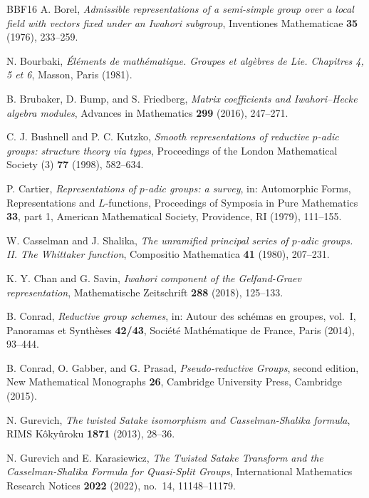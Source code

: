 \documentclass[12pt]{article}
\numberwithin{equation}{section}
\theoremstyle{definition}
\theoremstyle{remark}
\theoremstyle{plain}
\begin{document}
\begin{thebibliography}{BBF16}
\setlength{\itemsep}{1pt}
 A. Borel, \textit{Admissible representations of a semi-simple group over a local field with vectors fixed under an Iwahori subgroup}, Inventiones Mathematicae \textbf{35} (1976), 233--259.

 N. Bourbaki, \textit{\'El\'ements de math\'ematique. Groupes et alg\`ebres de Lie. Chapitres 4, 5 et 6}, Masson, Paris (1981).

 B. Brubaker, D. Bump, and S. Friedberg, \textit{Matrix coefficients and Iwahori--Hecke algebra modules}, Advances in Mathematics \textbf{299} (2016), 247--271.

 C. J. Bushnell and P. C. Kutzko, \textit{Smooth representations of reductive $p$-adic groups: structure theory via types}, Proceedings of the London Mathematical Society (3) \textbf{77} (1998), 582--634.

 P. Cartier, \textit{Representations of $p$-adic groups: a survey}, in: Automorphic Forms, Representations and $L$-functions, Proceedings of Symposia in Pure Mathematics \textbf{33}, part 1, American Mathematical Society, Providence, RI (1979), 111--155.

 W. Casselman and J. Shalika, \textit{The unramified principal series of $p$-adic groups. II. The Whittaker function}, Compositio Mathematica \textbf{41} (1980), 207--231.

 K. Y. Chan and G. Savin, \textit{Iwahori component of the Gelfand-Graev representation}, Mathematische Zeitschrift \textbf{288} (2018), 125--133.

 B. Conrad, \textit{Reductive group schemes}, in: Autour des sch\'emas en groupes, vol.~I, Panoramas et Synth\`eses \textbf{42/43}, Soci\'et\'e Math\'ematique de France, Paris (2014), 93--444.

 B. Conrad, O. Gabber, and G. Prasad, \textit{Pseudo-reductive Groups}, second edition, New Mathematical Monographs \textbf{26}, Cambridge University Press, Cambridge (2015).

 N. Gurevich, \textit{The twisted Satake isomorphism and Casselman-Shalika formula}, RIMS K\^{o}ky\^{u}roku \textbf{1871} (2013), 28--36.

 N. Gurevich and E. Karasiewicz, \textit{The Twisted Satake Transform and the Casselman-Shalika Formula for Quasi-Split Groups}, International Mathematics Research Notices \textbf{2022} (2022), no.~14, 11148--11179.


\end{thebibliography}
\end{document}
